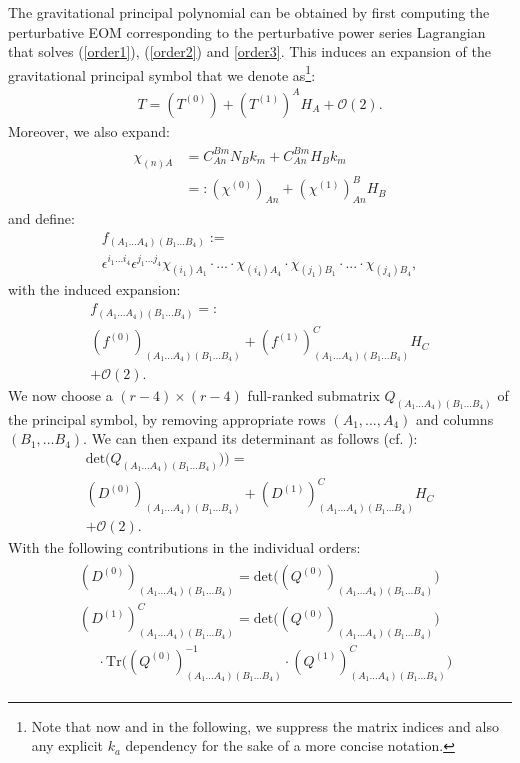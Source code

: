 \documentclass[%
 reprint,
nofootinbib,
 amsmath,amssymb,
 aps,
 prd,
floatfix,
]{revtex4-2}
\begin{document}
The gravitational principal polynomial can be obtained by first computing the perturbative EOM corresponding to the perturbative power series Lagrangian that solves (\ref{order1}), (\ref{order2}) and \ref{order3}. This induces an expansion of the gravitational principal symbol that we denote as\footnote{Note that now and in the following, we suppress the matrix indices and also any explicit $k_a$ dependency for the sake of a more concise notation.}:
\begin{align}
    T = (T^{(0)}) + (T^{(1)})^AH_A + \mathcal{O}(2).
\end{align}
Moreover, we also expand:
\begin{align}
\begin{aligned}
\chi_{(n)A} &=  C^{Bm}_{An} N_B k_m + C^{Bm}_{An} H_B k_m\\
&=: (\chi^{(0)})_{An} + (\chi^{(1)})^B_{An}H_B
\end{aligned}
\end{align}
and define:
\begin{multline}\label{PreF}
f_{(A_1...A_4)(B_1...B_4)} := \\
\epsilon^{i_1...i_4} \epsilon^{j_1...j_4} \chi_{(i_1)A_1} \cdot ... \cdot \chi_{(i_4)A_4}\cdot \chi_{(j_1)B_1} \cdot ... \cdot \chi_{(j_4)B_4},
\end{multline}
with the induced expansion:
\begin{multline}
f_{(A_1...A_4)(B_1...B_4)} =: \\
(f^{(0)})_{(A_1...A_4)(B_1...B_4)} + (f^{(1)})^C_{(A_1...A_4)(B_1...B_4)}H_C\\
+ \mathcal{O}(2).
\end{multline}
We now choose a $(r-4) \times (r-4)$ full-ranked submatrix $Q_{(A_1...A_4)(B_1...B_4)}$ of the principal symbol, by removing appropriate rows $(A_1,...,A_4)$ and columns $(B_1,...B_4)$. We can then expand its determinant as follows (cf. \cite{IMM2012-03274}):
\begin{multline}
    \mathrm{det}\bigl(Q_{(A_1...A_4)(B_1...B_4)})\bigr) =\\
    (D^{(0)})_{(A_1...A_4)(B_1...B_4)} + (D^{(1)})^C_{(A_1...A_4)(B_1...B_4)}H_C\\
    + \mathcal{O}(2).
\end{multline}
With the following contributions in the individual orders:
\begin{align}\label{polyMatrices}
\begin{aligned}
  &(D^{(0)})_{(A_1...A_4)(B_1...B_4)} =  \mathrm{det}\bigl((Q^{(0)})_{(A_1...A_4)(B_1...B_4)}\bigr) \\
  &(D^{(1)})^C_{(A_1...A_4)(B_1...B_4)} = \mathrm{det}\bigl((Q^{(0)})_{(A_1...A_4)(B_1...B_4)}\bigr) \\
 & \ \ \ \ \ \ \cdot \mathrm{Tr} \bigl ( (Q^{(0)})^{-1}_{(A_1...A_4)(B_1...B_4)} 
   \cdot (Q^{(1)})_{(A_1...A_4)(B_1...B_4)}^C \bigr) 
\end{aligned}
\end{align} 
\end{document}
